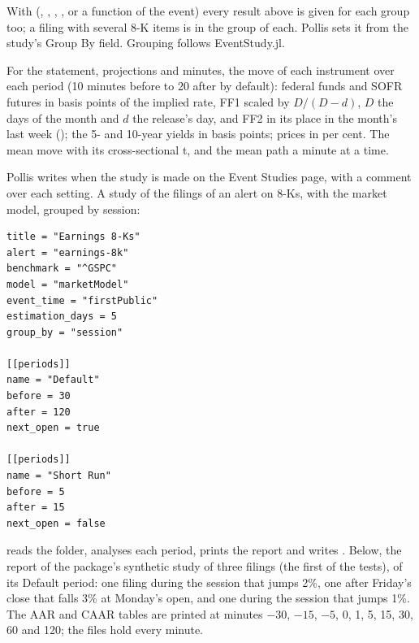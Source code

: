 With  (, , , , or a function of the event) every result
above is given for each group too; a filing with several 8-K items is in the group of each. Pollis sets it from the
study's Group By field. Grouping follows EventStudy.jl.

For the statement, projections and minutes, the move of each instrument over each period (10 minutes before to 20 after
by default): federal funds and SOFR futures in basis points of the implied rate, FF1 scaled by $D/(D-d)$, $D$ the days
of the month and $d$ the release's day, and FF2 in its place in the month's last week (); the 5- and 10-year yields in basis points; prices in per cent. The mean move with its cross-sectional t, and the
mean path a minute at a time.

Pollis writes  when the study is made on the Event Studies page, with a comment over each setting. A study
of the filings of an alert on 8-Ks, with the market model, grouped by session:

\begingroup\footnotesize
\begin{verbatim}
title = "Earnings 8-Ks"
alert = "earnings-8k"
benchmark = "^GSPC"
model = "marketModel"
event_time = "firstPublic"
estimation_days = 5
group_by = "session"

[[periods]]
name = "Default"
before = 30
after = 120
next_open = true

[[periods]]
name = "Short Run"
before = 5
after = 15
next_open = false
\end{verbatim}
\endgroup


 reads the folder, analyses each period, prints the report and writes . Below, the
report of the package's synthetic study of three filings (the first of the tests), of its Default period: one filing
during the session that jumps 2\%, one after Friday's close that falls 3\% at Monday's open, and one during the session
that jumps 1\%. The AAR and CAAR tables are printed at minutes $-30$, $-15$, $-5$, 0, 1, 5, 15, 30, 60 and 120; the
files hold every minute.

